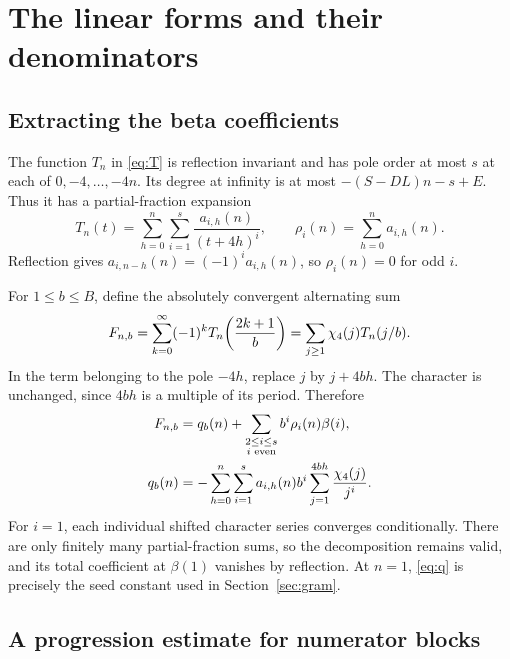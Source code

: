 \section{The linear forms and their denominators}\label{sec:arithmetic}

\subsection{Extracting the beta coefficients}

The function $T_n$ in \eqref{eq:T} is reflection invariant and has
pole order at most $s$ at each of $0,-4,\ldots,-4n$. Its degree
at infinity is at most $-(S-DL)n-s+E$. Thus it has a partial-fraction
expansion
\begin{equation}\label{eq:partials}
 T_n(t)=\sum_{h=0}^n\sum_{i=1}^s\frac{a_{i,h}(n)}{(t+4h)^i},
 \qquad \rho_i(n)=\sum_{h=0}^n a_{i,h}(n).
\end{equation}
Reflection gives $a_{i,n-h}(n)=(-1)^ia_{i,h}(n)$, so
$\rho_i(n)=0$ for odd $i$.

For $1\le b\le B$, define the absolutely convergent alternating sum
\begin{equation}\label{eq:F}
 F_{n,b}=\sum_{k=0}^{\infty}(-1)^k
                   T_n\!\left(\frac{2k+1}{b}\right)
        =\sum_{j\ge1}\chi_4(j)T_n(j/b).
\end{equation}
In the term belonging to the pole $-4h$, replace $j$ by $j+4bh$.
The character is unchanged, since $4bh$ is a multiple of its period.
Therefore
\begin{align}
 F_{n,b}&=q_b(n)+\sum_{\substack{2\le i\le s\\i\text{ even}}}
                     b^i\rho_i(n)\beta(i),\label{eq:forms}\\
 q_b(n)&=-\sum_{h=0}^n\sum_{i=1}^s a_{i,h}(n)b^i
                       \sum_{j=1}^{4bh}\frac{\chi_4(j)}{j^i}.
                       \label{eq:q}
\end{align}
For $i=1$, each individual shifted character series converges
conditionally. There are only finitely many partial-fraction sums,
so the decomposition remains valid, and its total coefficient at
$\beta(1)$ vanishes by reflection. At $n=1$, \eqref{eq:q} is precisely
the seed constant used in Section~\ref{sec:gram}.

\subsection{A progression estimate for numerator blocks}

